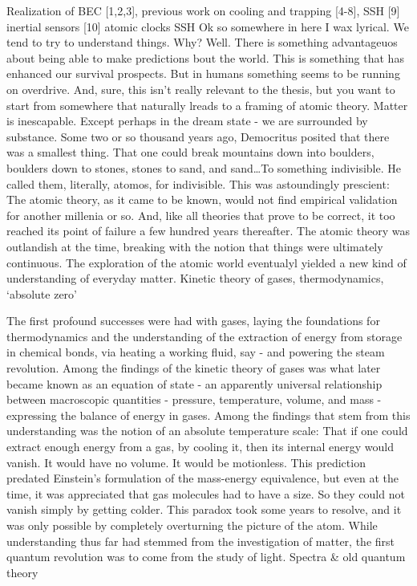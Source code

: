 Realization of BEC [1,2,3], previous work on cooling and trapping [4-8], SSH 
		[9] inertial sensors [10] atomic clocks SSH
Ok so somewhere in here I wax lyrical.
	We tend to try to understand
things.
	Why? Well.
	There is something advantageuos about being able to
make predictions bout the world.
	This is something that has enhanced our
survival prospects.
	But in humans something seems to be running on
overdrive.
	And, sure, this isn't really relevant to the thesis, but you
want to start from somewhere that naturally lreads to a framing of
atomic theory.
	Matter is inescapable.
	Except perhaps in the dream state
- we are surrounded by substance.
	Some two or so thousand years ago,
Democritus posited that there was a smallest thing.
	That one could break
mountains down into boulders, boulders down to stones, stones to sand,
and sand\ldots To something indivisible.
	He called them, literally,
atomos, for indivisible.
	This was astoundingly prescient: The atomic
theory, as it came to be known, would not find empirical validation for
another millenia or so.
	And, like all theories that prove to be correct,
it too reached its point of failure a few hundred years thereafter.
	The
atomic theory was outlandish at the time, breaking with the notion that
things were ultimately continuous.
	The exploration of the atomic world
eventualyl yielded a new kind of understanding of everyday matter.
Kinetic theory of gases, thermodynamics, `absolute zero'


The first profound successes were had with gases, laying the foundations
for thermodynamics and the understanding of the extraction of energy
from storage in chemical bonds, via heating a working fluid, say - and
powering the steam revolution.
	Among the findings of the kinetic theory
of gases was what later became known as an equation of state - an
apparently universal relationship between macroscopic quantities -
pressure, temperature, volume, and mass - expressing the balance of
energy in gases.
	Among the findings that stem from this understanding
was the notion of an absolute temperature scale: That if one could
extract enough energy from a gas, by cooling it, then its internal
energy would vanish.
	It would have no volume.
	It would be motionless.
This prediction predated Einstein's formulation of the mass-energy
equivalence, but even at the time, it was appreciated that gas molecules
had to have a size.
	So they could not vanish simply by getting colder.
This paradox took some years to resolve, and it was only possible by
completely overturning the picture of the atom.
	While understanding thus
far had stemmed from the investigation of matter, the first quantum
revolution was to come from the study of light.
	Spectra \& old quantum
theory

